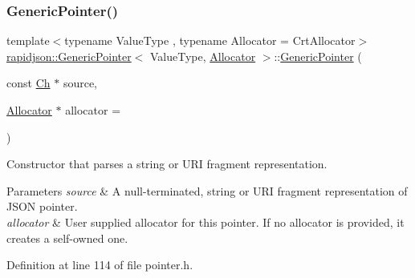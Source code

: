 \subsubsection{\texorpdfstring{GenericPointer()}{GenericPointer()}\hspace{0.1cm}{\footnotesize\ttfamily [2/6]}}
{\footnotesize\ttfamily template$<$typename Value\+Type , typename Allocator  = Crt\+Allocator$>$ \\
\mbox{\hyperlink{classrapidjson_1_1_generic_pointer}{rapidjson\+::\+Generic\+Pointer}}$<$ Value\+Type, \mbox{\hyperlink{classrapidjson_1_1_allocator}{Allocator}} $>$\+::\mbox{\hyperlink{classrapidjson_1_1_generic_pointer}{Generic\+Pointer}} (\begin{DoxyParamCaption}\item[{const \mbox{\hyperlink{classrapidjson_1_1_generic_pointer_a850f78846c5548565f8395be5f3427b7}{Ch}} $\ast$}]{source,  }\item[{\mbox{\hyperlink{classrapidjson_1_1_allocator}{Allocator}} $\ast$}]{allocator = {} }\end{DoxyParamCaption})\hspace{0.3cm}{\ttfamily [explicit]}}



Constructor that parses a string or U\+RI fragment representation. 


\begin{DoxyParams}{Parameters}
{\em source} & A null-\/terminated, string or U\+RI fragment representation of J\+S\+ON pointer. \\
\hline
{\em allocator} & User supplied allocator for this pointer. If no allocator is provided, it creates a self-\/owned one. \\
\hline
\end{DoxyParams}


Definition at line 114 of file pointer.\+h.


